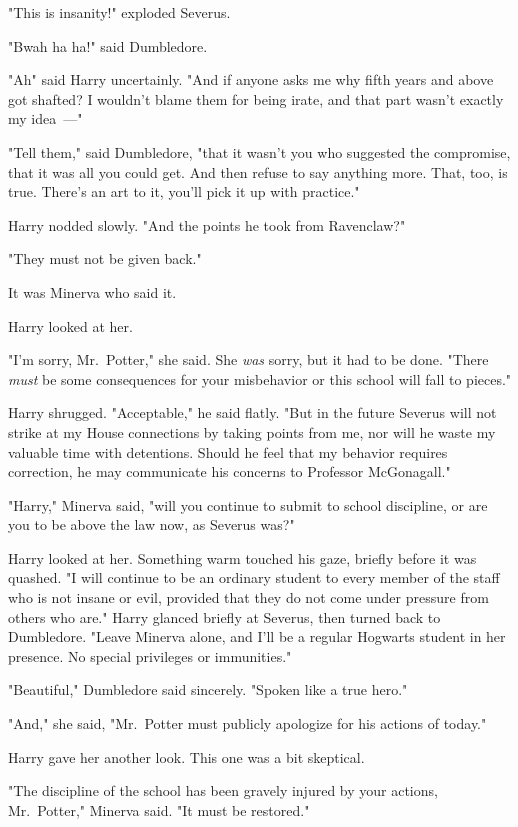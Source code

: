 "This is insanity!" exploded Severus.

"Bwah ha ha!" said Dumbledore.

"Ah{\el}" said Harry uncertainly. "And if anyone asks me why fifth years and
above got shafted? I wouldn't blame them for being irate, and that part wasn't
exactly my idea~---"

"Tell them," said Dumbledore, "that it wasn't you who suggested the compromise,
that it was all you could get. And then refuse to say anything more. That, too,
is true. There's an art to it, you'll pick it up with practice."

Harry nodded slowly. "And the points he took from Ravenclaw?"

"They must not be given back."

It was Minerva who said it.

Harry looked at her.

"I'm sorry, Mr.~Potter," she said. She \emph{was} sorry, but it had to be done.
"There \emph{must} be some consequences for your misbehavior or this school
will fall to pieces."

Harry shrugged. "Acceptable," he said flatly. "But in the future Severus will
not strike at my House connections by taking points from me, nor will he waste
my valuable time with detentions. Should he feel that my behavior requires
correction, he may communicate his concerns to Professor McGonagall."

"Harry," Minerva said, "will you continue to submit to school discipline, or
are you to be above the law now, as Severus was?"

Harry looked at her. Something warm touched his gaze, briefly before it was
quashed. "I will continue to be an ordinary student to every member of the
staff who is not insane or evil, provided that they do not come under pressure
from others who are." Harry glanced briefly at Severus, then turned back to
Dumbledore. "Leave Minerva alone, and I'll be a regular Hogwarts student in her
presence. No special privileges or immunities."

"Beautiful," Dumbledore said sincerely. "Spoken like a true hero."

"And," she said, "Mr.~Potter must publicly apologize for his actions of today."

Harry gave her another look. This one was a bit skeptical.

"The discipline of the school has been gravely injured by your actions,
Mr.~Potter," Minerva said. "It must be restored."

